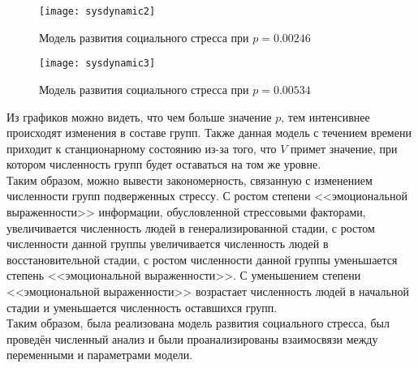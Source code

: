 \begin{figure}[h]
	\centering \texttt{[image: sysdynamic2]}
	\caption{Модель развития социального стресса при $p = 0.00246$}
	\label{fig:sysdynamic2}
\end{figure}

\newpage

\begin{figure}[h]
	\centering \texttt{[image: sysdynamic3]}
	\caption{Модель развития социального стресса при $p = 0.00534$}
	\label{fig:sysdynamic3}
\end{figure}

Из графиков можно видеть, что чем больше значение $p$, тем интенсивнее происходят изменения в составе групп. Также данная модель с течением времени приходит к станционарному состоянию из-за того, что $V$ примет значение, при котором численность групп будет оставаться на том же уровне.\\

Таким образом, можно вывести закономерность, связанную с изменением численности групп подверженных стрессу. С ростом степени <<эмоциональной выраженности>> информации, обусловленной стрессовыми факторами, увеличивается численность людей в генерализированной стадии, с ростом численности данной группы увеличивается численность людей в восстановительной стадии, с ростом численности данной группы уменьшается степень <<эмоциональной выраженности>>. С уменьшением степени <<эмоциональной выраженности>> возрастает численность людей в начальной стадии и уменьшается численность оставшихся групп.\\

Таким образом, была реализована модель развития социального стресса, был проведён численный анализ и были проанализированы взаимосвязи между переменными и параметрами модели.